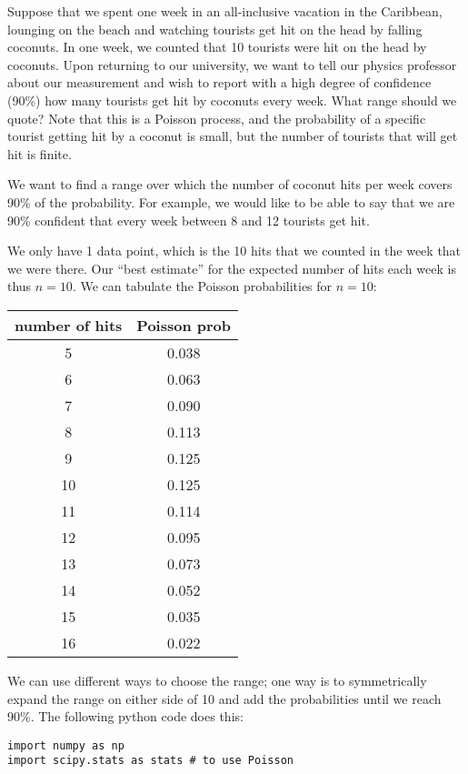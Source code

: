\begin{example}{}{Suppose that we spent one week in an all-inclusive vacation in the Caribbean, lounging on the beach and watching tourists get hit on the head by falling coconuts. In one week, we counted that 10 tourists were hit on the head by coconuts. Upon returning to our university, we want to tell our physics professor about our measurement and wish to report with a high degree of confidence (90\%) how many tourists get hit by coconuts every week. What range should we quote?}{}
\label{ex:PoissonCoconut}
Note that this is a Poisson process, and the probability of a specific tourist getting hit by a coconut is small, but the number of tourists that will get hit is finite.

We want to find a range over which the number of coconut hits per week covers 90\% of the probability. For example, we would like to be able to say that we are 90\% confident that every week between 8 and 12 tourists get hit. 

We only have 1 data point, which is the 10 hits that we counted in the week that we were there. Our ``best estimate'' for the expected number of hits each week is thus $n=10$. We can tabulate the Poisson probabilities for $n=10$:

\begin{center}
\begin{tabular}{|c|c|}
\hline
number of hits & Poisson prob\\
\hline
5 & 0.038 \\
\hline
6 & 0.063 \\
\hline
7 & 0.090 \\
\hline
8 & 0.113 \\
\hline
9 & 0.125 \\
\hline
\cellcolor{gray!25} 10 & \cellcolor{gray!25} 0.125 \\
\hline
11 & 0.114 \\
\hline
12 & 0.095 \\
\hline
13 & 0.073 \\
\hline
14 & 0.052 \\
\hline
15 & 0.035 \\
\hline
16 & 0.022 \\
\hline
\end{tabular}
\end{center}

We can use different ways to choose the range; one way is to symmetrically expand the range on either side of 10 and add the probabilities until we reach 90\%. The following python code does this:
\begin{lstlisting}[frame=single] 
import numpy as np
import scipy.stats as stats # to use Poisson


\end{lstlisting}
\end{example}
